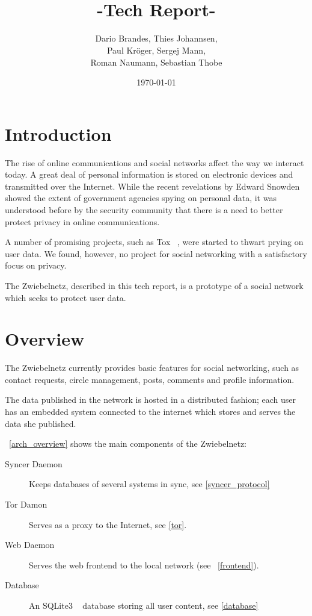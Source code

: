 \documentclass[12pt]{article}
\title{\textpgoth{\Huge{Zwiebelnetz}}\\ \small{-Tech Report-}}
\author{Dario Brandes, Thies Johannsen,\\Paul Kröger, Sergej Mann,\\Roman Naumann, Sebastian Thobe}
\date{\today}
\begin{document}
\maketitle

\onehalfspacing

\tableofcontents

\listoftodos
\section{Introduction}

The rise of online communications and social networks affect the way we interact today. A great deal of personal information is stored on electronic devices and transmitted over the Internet.
While the recent revelations by Edward Snowden showed the extent of government agencies spying on personal data, it was understood before by the security community that there is a need to better protect privacy in online communications.

A number of promising projects, such as Tox ~\cite{ToxProject}, were started to thwart prying on user data. We found, however, no project for social networking with a satisfactory focus on privacy.

The Zwiebelnetz, described in this tech report, is a prototype of a social network which seeks to protect user data.

\section{Overview}

The Zwiebelnetz currently provides basic features for social networking, such as contact requests, circle management, posts, comments and profile information.

The data published in the network is hosted in a distributed fashion; each user has an embedded system connected to the internet which stores and serves the data she published.

~\autoref{arch_overview} shows the main components of the Zwiebelnetz:
\begin{description}
\item[Syncer Daemon] Keeps databases of several systems in sync, see \autoref{syncer_protocol}
\item[Tor Damon] Serves as a proxy to the Internet, see \autoref{tor}.
\item[Web Daemon] Serves the web frontend to the local network 	(see ~\autoref{frontend}).
\item[Database] An SQLite3 ~\cite{sqlite} database storing all user content, see \autoref{database}
\end{description}
\end{document}
